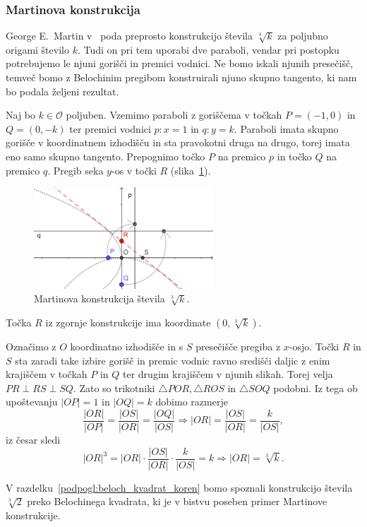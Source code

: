 \subsubsection*{Martinova konstrukcija}

George E.\ Martin v~\cite[str.\ 156--157]{geometricconstructions} poda preprosto konstrukcijo števila $\sqrt[3]{k}$ za poljubno origami število $k$. Tudi on pri tem uporabi dve paraboli, vendar pri postopku potrebujemo le njuni gorišči in premici vodnici. Ne bomo iskali njunih presečišč, temveč bomo z Belochinim pregibom konstruirali njuno skupno tangento, ki nam bo podala željeni rezultat.

Naj bo $k \in \mathcal{O}$ poljuben. Vzemimo paraboli z goriščema v točkah $P = (-1, 0)$ in $Q = (0, -k)$ ter premici vodnici $p: x = 1$ in $q: y = k$. Paraboli imata skupno gorišče v koordinatnem izhodišču in sta pravokotni druga na drugo, torej imata eno samo skupno tangento. Prepognimo točko $P$ na premico $p$ in točko $Q$ na premico $q$. Pregib seka $y$-os v točki $R$ (slika~\ref{fig:martin}).
\begin{figure}[h]
    \centering
    \includegraphics[width=0.6\textwidth]{images/starogr_problemi/cube_martin.png}
    \caption[Martinova konstrukcija kubičnega korena]{Martinova konstrukcija števila $\sqrt[3]{k}$.}
    \label{fig:martin}
\end{figure}
\begin{trditev}
    Točka $R$ iz zgornje konstrukcije ima koordinate $(0, \sqrt[3]{k})$.
\end{trditev}
\begin{dokaz}
    Označimo z $O$ koordinatno izhodišče in s $S$ presečišče pregiba z $x$-osjo. Točki $R$ in $S$ sta zaradi take izbire gorišč in premic vodnic ravno središči daljic z enim krajiščem v točkah $P$ in $Q$ ter drugim krajiščem v njunih slikah. Torej velja $PR \perp RS \perp SQ$. Zato so trikotniki $\triangle POR, \triangle ROS$ in $\triangle SOQ$ podobni. Iz tega ob upoštevanju $|OP| = 1$ in $|OQ| = k$ dobimo razmerje
    $$ \frac{|OR|}{|OP|} = \frac{|OS|}{|OR|} = \frac{|OQ|}{|OS|} \Longrightarrow |OR| = \frac{|OS|}{|OR|} = \frac{k}{|OS|}, $$
    iz česar sledi
    $$ |OR|^3 = |OR| \cdot \frac{|OS|}{|OR|} \cdot \frac{k}{|OS|} = k \Longrightarrow |OR| = \sqrt[3]{k}.$$
\end{dokaz}
\begin{opomba}
    V razdelku~\ref{podpogl:beloch_kvadrat_koren} bomo spoznali konstrukcijo števila $\sqrt[3]{2}$ preko Belochinega kvadrata, ki je v bistvu poseben primer Martinove konstrukcije.
\end{opomba}

